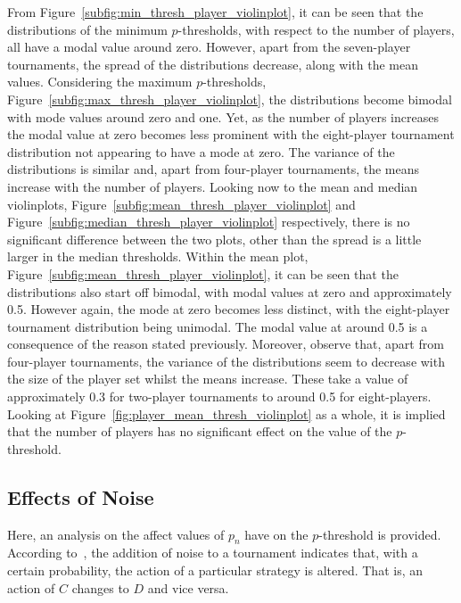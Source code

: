 From Figure~\ref{subfig:min_thresh_player_violinplot}, it can be seen that the
distributions of the minimum \(p\)-thresholds, with respect to the number of
players, all have a modal value around zero. However, apart from the seven-player
tournaments, the spread of the distributions decrease, along with the mean
values. Considering the maximum \(p\)-thresholds, Figure~\ref{subfig:max_thresh_player_violinplot}, the distributions become bimodal
with mode values around zero and one. Yet, as the number of players increases the
modal value at zero becomes less prominent with the eight-player tournament
distribution not appearing to have a mode at zero. The variance of the distributions is
similar and, apart from four-player tournaments, the means increase with the number
of players. Looking now to the mean and median violinplots, Figure~\ref{subfig:mean_thresh_player_violinplot}
and Figure~\ref{subfig:median_thresh_player_violinplot} respectively, there is no
significant difference between the two plots, other than the spread is a little
larger in the median thresholds. Within the mean plot, Figure~\ref{subfig:mean_thresh_player_violinplot}, it can be seen that the
distributions also start off bimodal, with modal values at zero and approximately 0.5. However again, the
mode at zero becomes less distinct, with the eight-player tournament
distribution being unimodal. The modal value at around 0.5 is a consequence of
the reason stated previously. Moreover, observe that, apart from
four-player tournaments, the variance of the distributions seem to decrease with
the size of the player set whilst the means increase. These take a value of
approximately 0.3 for two-player tournaments to around 0.5 for eight-players. Looking
at Figure~\ref{fig:player_mean_thresh_violinplot} as a whole, it is implied
that the number of players has no significant effect on the value of the
\(p\)-threshold.


\subsection{Effects of Noise}\label{subsec:Effects_of_Noise}
Here, an analysis on the affect values of \(p_{n}\) have on the \(p\)-threshold is provided.
According to~\cite{glynatsi2020meta}, the addition of noise to a tournament indicates that, with a certain
probability, the action of a particular strategy is
altered. That is, an action of \(C\) changes to \(D\) and vice versa.  



